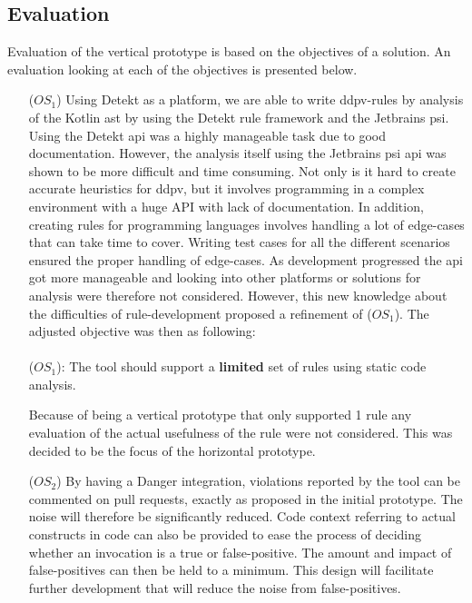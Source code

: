 \documentclass[pdftex,10pt,b5paper,twoside]{report}
\begin{document}
\subsection*{Evaluation}
Evaluation of the vertical prototype is based on the objectives of a solution. An evaluation looking at each of the objectives is presented below.
\begin{itemize}
    \item [(\(OS_{1}\))] Using Detekt as a platform, we are able to write \gls{ddpv}-rules by analysis of the Kotlin \gls{ast} by using the Detekt rule framework and the Jetbrains \gls{psi}. Using the Detekt \gls{api} was a highly manageable task due to good documentation. However, the analysis itself using the Jetbrains \gls{psi} \gls{api} was shown to be more difficult and time consuming. Not only is it hard to create accurate heuristics for \gls{ddpv}, but it involves programming in a complex environment with a huge API with lack of documentation. In addition, creating rules for programming languages involves handling a lot of edge-cases that can take time to cover. Writing test cases for all the different scenarios ensured the proper handling of edge-cases. As development progressed the \gls{api} got more manageable and looking into other platforms or solutions for analysis were therefore not considered. However, this new knowledge about the difficulties of rule-development proposed a refinement of (\(OS_{1}\)). The adjusted objective was then as following: \\\\(\(OS_{1}\)): The tool should support a \textbf{limited} set of rules using static code analysis. \label{vertical-os1}
    
    Because of being a vertical prototype that only supported 1 rule any evaluation of the actual usefulness of the rule were not considered. This was decided to be the focus of the horizontal prototype.
    
    \item [(\(OS_{2}\))] By having a Danger integration, violations reported by the tool can be commented on pull requests, exactly as proposed in the initial prototype. The noise will therefore be significantly reduced. Code context referring to actual constructs in code can also be provided to ease the process of deciding whether an invocation is a true or false-positive. The amount and impact of false-positives can then be held to a minimum. This design will facilitate further development that will reduce the noise from false-positives. 
    

\end{itemize}
\end{document}
